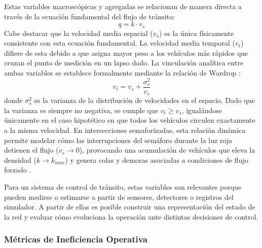 Estas variables macroscópicas y agregadas se relacionan de manera directa a través de la ecuación fundamental del flujo de tránsito:
\begin{equation}
    q = k \cdot v_s
\end{equation}
Cabe destacar que la velocidad media espacial ($v_s$) es la única físicamente consistente con esta ecuación fundamental. La velocidad media temporal ($v_t$) difiere de esta debido a que asigna mayor peso a los vehículos más rápidos que cruzan el punto de medición en un lapso dado. La vinculación analítica entre ambas variables se establece formalmente mediante la relación de Wardrop \cite{fernandez}:
\begin{equation}
    v_t = v_s + \frac{\sigma_s^2}{v_s}
\end{equation}
donde $\sigma_s^2$ es la varianza de la distribución de velocidades en el espacio. Dado que la varianza es siempre no negativa, se cumple que $v_t \ge v_s$, igualándose únicamente en el caso hipotético en que todos los vehículos circulen exactamente a la misma velocidad. En intersecciones semaforizadas, esta relación dinámica permite modelar cómo las interrupciones del semáforo durante la luz roja detienen el flujo ($v_s \to 0$), provocando una acumulación de vehículos que eleva la densidad ($k \to k_{max}$) y genera colas y demoras asociadas a condiciones de flujo forzado \cite[pp.~315--316]{calymayor}.

Para un sistema de control de tránsito, estas variables son relevantes porque pueden medirse o estimarse a partir de sensores, detectores o registros del simulador. A partir de ellas es posible construir una representación del estado de la red y evaluar cómo evoluciona la operación ante distintas decisiones de control.

\subsubsection{Métricas de Ineficiencia Operativa}

